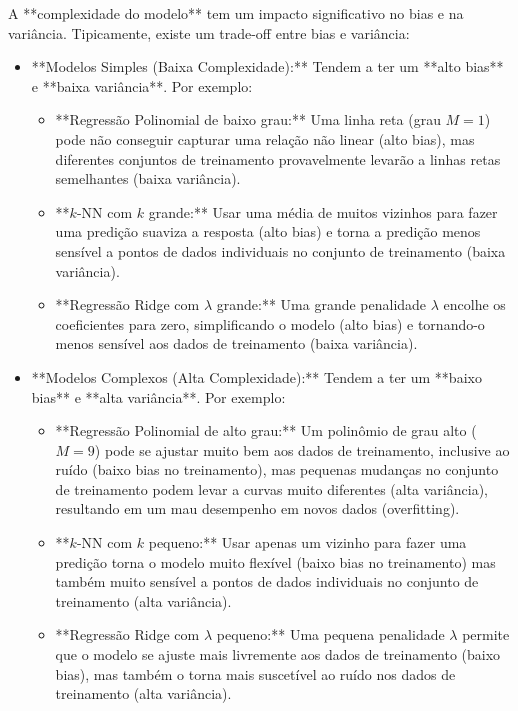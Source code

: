 \documentclass{article}
\begin{document}
A **complexidade do modelo** tem um impacto significativo no bias e na variância. Tipicamente, existe um trade-off entre bias e variância:

\begin{itemize}
    \item **Modelos Simples (Baixa Complexidade):** Tendem a ter um **alto bias** e **baixa variância**. Por exemplo:
    \begin{itemize}
        \item **Regressão Polinomial de baixo grau:** Uma linha reta (grau $M=1$) pode não conseguir capturar uma relação não linear (alto bias), mas diferentes conjuntos de treinamento provavelmente levarão a linhas retas semelhantes (baixa variância).
        \item **$k$-NN com $k$ grande:** Usar uma média de muitos vizinhos para fazer uma predição suaviza a resposta (alto bias) e torna a predição menos sensível a pontos de dados individuais no conjunto de treinamento (baixa variância).
        \item **Regressão Ridge com $\lambda$ grande:** Uma grande penalidade $\lambda$ encolhe os coeficientes para zero, simplificando o modelo (alto bias) e tornando-o menos sensível aos dados de treinamento (baixa variância).
    \end{itemize}
    \item **Modelos Complexos (Alta Complexidade):** Tendem a ter um **baixo bias** e **alta variância**. Por exemplo:
    \begin{itemize}
        \item **Regressão Polinomial de alto grau:** Um polinômio de grau alto ($M=9$) pode se ajustar muito bem aos dados de treinamento, inclusive ao ruído (baixo bias no treinamento), mas pequenas mudanças no conjunto de treinamento podem levar a curvas muito diferentes (alta variância), resultando em um mau desempenho em novos dados (overfitting).
        \item **$k$-NN com $k$ pequeno:** Usar apenas um vizinho para fazer uma predição torna o modelo muito flexível (baixo bias no treinamento) mas também muito sensível a pontos de dados individuais no conjunto de treinamento (alta variância).
        \item **Regressão Ridge com $\lambda$ pequeno:** Uma pequena penalidade $\lambda$ permite que o modelo se ajuste mais livremente aos dados de treinamento (baixo bias), mas também o torna mais suscetível ao ruído nos dados de treinamento (alta variância).
    \end{itemize}
\end{itemize}
\end{document}
